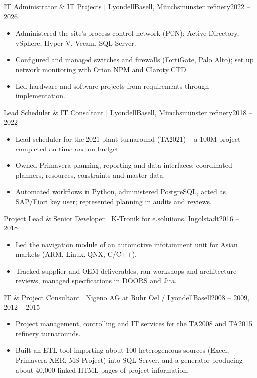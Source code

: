 \documentclass[10pt,a4paper]{article}
\newcommand*{\semibold}{\fontseries{sb}\selectfont}
\newcommand*{\job}[3]{%
  \par\addvspace{4pt}%
  {\semibold #1}\,{\color{muted}\,|\,\,#2}\hfill{\color{muted}\small #3}\par}
\begin{document}
\job{IT Administrator \& IT Projects}{LyondellBasell, Münchsmünster refinery}{2022 -- 2026}
\begin{itemize}
  \item Administered the site's process control network (PCN): Active Directory, vSphere, Hyper-V, Veeam, SQL Server.
  \item Configured and managed switches and firewalls (FortiGate, Palo Alto); set up network monitoring with Orion NPM and Claroty CTD.
  \item Led hardware and software projects from requirements through implementation.
\end{itemize}

\job{Lead Scheduler \& IT Consultant}{LyondellBasell, Münchsmünster refinery}{2018 -- 2022}
\begin{itemize}
  \item Lead scheduler for the 2021 plant turnaround (TA2021) -- a 100M project completed on time and on budget.
  \item Owned Primavera planning, reporting and data interfaces; coordinated planners, resources, constraints and master data.
  \item Automated workflows in Python, administered PostgreSQL, acted as SAP/Fiori key user; represented planning in audits and reviews.
\end{itemize}

\job{Project Lead \& Senior Developer}{K-Tronik for e.solutions, Ingolstadt}{2016 -- 2018}
\begin{itemize}
  \item Led the navigation module of an automotive infotainment unit for Asian markets (ARM, Linux, QNX, C/C++).
  \item Tracked supplier and OEM deliverables, ran workshops and architecture reviews, managed specifications in DOORS and Jira.
\end{itemize}

\job{IT \& Project Consultant}{Nigeno AG at Ruhr Oel / LyondellBasell}{2008 -- 2009, 2012 -- 2015}
\begin{itemize}
  \item Project management, controlling and IT services for the TA2008 and TA2015 refinery turnarounds.
  \item Built an ETL tool importing about 100 heterogeneous sources (Excel, Primavera XER, MS Project) into SQL Server, and a generator producing about 40,000 linked HTML pages of project information.
\end{itemize}
\end{document}
